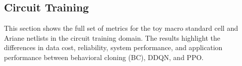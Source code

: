 \subsection{Circuit Training}
\label{appendix:circuit_training}

This section shows the full set of metrics for the toy macro standard cell and Ariane netlists in the circuit training domain. The results highlight the differences in data cost, reliability, system performance, and application performance between behavioral cloning (BC), DDQN, and PPO.

\begin{table}[!htbp]
\centering
{}
\end{table}
